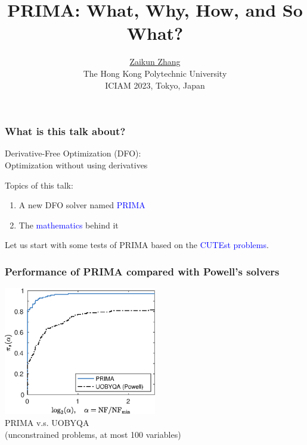 \documentclass[slidestop,mathserif,xcolor=dvipsnames]{beamer}
\title[\insertsection]
{PRIMA: What, Why, How, and So What?}
\author[]{
  {\href{https://www.zhangzk.net}{Zaikun Zhang}}
  \\[2ex]{\small The Hong Kong Polytechnic University}\\[3ex]
    {
        ICIAM 2023, Tokyo, Japan
        \\[9ex]
    }%
	}
\date{}
\newcommand{\blue}[1]{\textcolor{blue}{#1}}
\begin{document}
\begin{frame}[plain]
  \titlepage
\end{frame}

\begin{frame}
    \frametitle{What is this talk about?}

    \vspace{6ex}
    \begin{center}
        Derivative-Free Optimization (DFO): \\[1ex]

    Optimization without using derivatives
    \end{center}

    \vspace{2ex}

    Topics of this talk:
    \vspace{2ex}
    \begin{enumerate}
        \item A new DFO solver named \blue{PRIMA}
            \vspace{2ex}
        \item The \blue{mathematics} behind it
    \end{enumerate}

    \vspace{2ex}
    Let us start with some tests of PRIMA based on the \blue{CUTEst problems}.
\end{frame}


\begin{frame}
    \frametitle{Performance of PRIMA compared with Powell's solvers}
    \vspace{3ex}
    \begin{center}
    \includegraphics[width=0.5\textwidth]{prima_uobyqa.eps}
    \\[2ex]PRIMA v.s. UOBYQA \\[1ex](unconstrained problems, at most 100 variables)
    \end{center}
\end{frame}
\end{document}
